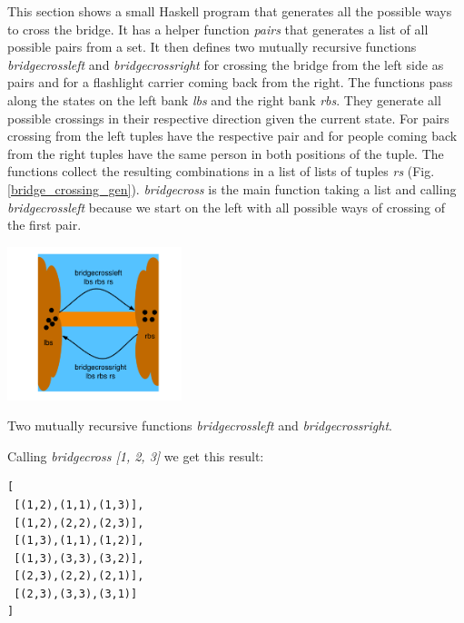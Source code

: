 This section shows a small Haskell program that generates all the possible ways to cross the bridge.  It has a helper function \emph{pairs} that generates a list of all possible pairs from a set. It then defines two mutually recursive functions \emph{bridgecrossleft} and \emph{bridgecrossright} for crossing the bridge from the left side as pairs and for a flashlight carrier coming back from the right. The functions pass along the states on the left bank \emph{lbs} and the right bank \emph{rbs}.  They generate all possible crossings in their respective direction given the current state. For pairs crossing from the left tuples have the respective pair and for people coming back from the right tuples have the same person in both positions of the tuple. The functions collect the resulting combinations in a list of lists of tuples \emph{rs} (Fig. \ref{bridge_crossing_gen}). \emph{bridgecross} is the main function taking a list and calling \emph{bridgecrossleft} because we start on the left with all possible ways of crossing of the first pair. 

\begin{marginfigure}
\includegraphics[width=2in]{fig.pdf}
\caption{Two mutually recursive functions \emph{bridgecrossleft} and \emph{bridgecrossright}.}
	\label{bridge_crossing_gen}
\end{marginfigure}

Calling \emph{bridgecross [1, 2, 3]} we get this result:

\begin{lstlisting}
[
 [(1,2),(1,1),(1,3)],
 [(1,2),(2,2),(2,3)],
 [(1,3),(1,1),(1,2)],
 [(1,3),(3,3),(3,2)],
 [(2,3),(2,2),(2,1)],
 [(2,3),(3,3),(3,1)]
]
\end{lstlisting}


\newpage


